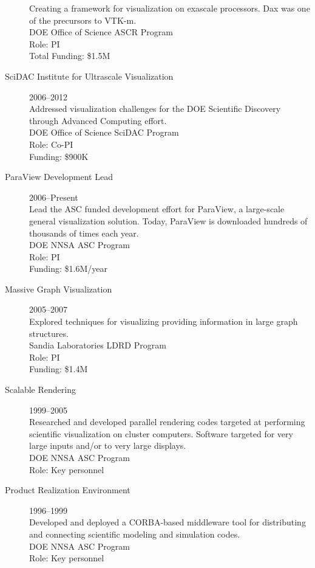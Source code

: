 \documentclass{article}
\begin{document}
\begin{description}
  Creating a framework for visualization on exascale processors. Dax was one of the precursors to \mbox{VTK-m}.\\
  DOE Office of Science ASCR Program\\
  Role: PI\\
  Total Funding: \$1.5M
\item[SciDAC Institute for Ultrascale Visualization]\hfill 2006--2012\\
  Addressed visualization challenges for the DOE Scientific Discovery through Advanced Computing effort.\\
  DOE Office of Science SciDAC Program\\
  Role: Co-PI\\
  Funding: \$900K
\item[ParaView Development Lead]\hfill 2006--Present\\
  Lead the ASC funded development effort for ParaView, a large-scale
  general visualization solution. Today, ParaView is downloaded hundreds of thousands of times each year.\\
  DOE NNSA ASC Program\\
  Role: PI\\
  Funding: \$1.6M/year %
\item[Massive Graph Visualization]\hfill 2005--2007 \\
  Explored techniques for visualizing providing information in large
  graph structures.\\
  Sandia Laboratories LDRD Program\\
  Role: PI\\
  Funding: \$1.4M
\item[Scalable Rendering]\hfill 1999--2005 \\
  Researched and developed parallel rendering codes targeted at performing scientific visualization on cluster computers.  Software targeted for very large inputs and/or to very large displays.\\
  DOE NNSA ASC Program\\
  Role: Key personnel
\item[Product Realization Environment]\hfill 1996--1999 \\
  Developed and deployed a CORBA-based middleware tool for distributing
  and connecting scientific modeling and simulation codes.\\
  DOE NNSA ASC Program\\
  Role: Key personnel
\end{description}
\end{document}

